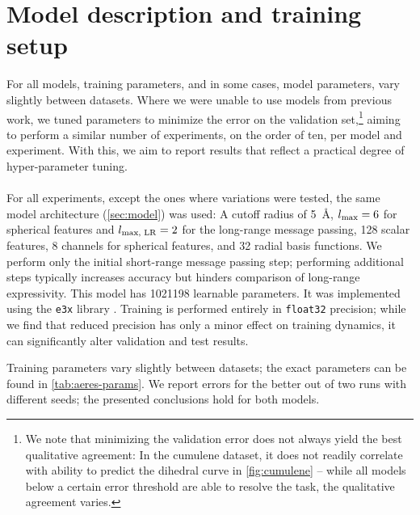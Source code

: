 \documentclass[10pt]{article} %
\newcommand{\ML}[1]{#1}
\begin{document}
\section{Model description and training setup}
\label{sec:apx-models}

For all models, training parameters, and in some cases, model parameters, vary slightly between datasets. Where we were unable to use models from previous work, we tuned parameters to minimize the error on the validation set,\footnote{We note that minimizing the validation error does not always yield the best qualitative agreement: In the cumulene dataset, it does not readily correlate with ability to predict the dihedral curve in \cref{fig:cumulene} -- while all models below a certain error threshold are able to resolve the task, the qualitative agreement varies.} aiming to perform a similar number of experiments, on the order of ten, per model and experiment. With this, we aim to report results that reflect a practical degree of hyper-parameter tuning.

\paragraph{\lorem}
For all experiments, except the ones where variations were tested, the same \lorem model  architecture (\cref{sec:model}) was used: A cutoff radius of \qty{5}{\angstrom}, $l_{\text{max}}=6$ for spherical features and $l_{\text{max, LR}}=2$ for the long-range message passing, \num{128} scalar features, \num{8} channels for spherical features, and \num{32} radial basis functions. We perform only the initial short-range message passing step; performing additional steps typically increases accuracy but hinders comparison of long-range expressivity. This model has \num{1021198} learnable parameters. It was implemented using the \texttt{e3x} library \citep{um2024}.
Training is performed entirely in \texttt{float32} precision; while we find that reduced precision has only a minor effect on training dynamics, it can significantly alter validation and test results.

Training parameters vary slightly between datasets; the exact parameters can be found in \cref{tab:aeres-params}. We report errors for the better out of two runs with different seeds; the presented conclusions hold for both models.
\end{document}
